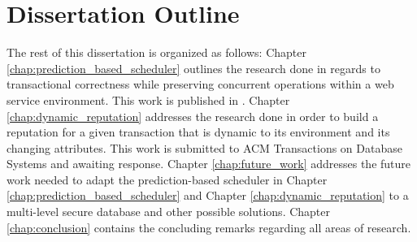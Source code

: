 \section{Dissertation Outline}
The rest of this dissertation is organized as follows: Chapter \ref{chap:prediction_based_scheduler} outlines the research done in regards to transactional correctness while preserving concurrent operations within a web service environment. This work is published in \cite{ravan_ensuring_2020}. Chapter \ref{chap:dynamic_reputation} addresses the research done in order to build a reputation for a given transaction that is dynamic to its environment and its changing attributes. This work is submitted to ACM Transactions on Database Systems and awaiting response. Chapter \ref{chap:future_work} addresses the future work needed to adapt the prediction-based scheduler in Chapter \ref{chap:prediction_based_scheduler} and Chapter \ref{chap:dynamic_reputation} to a multi-level secure database and other possible solutions. Chapter \ref{chap:conclusion} contains the concluding remarks regarding all areas of research.